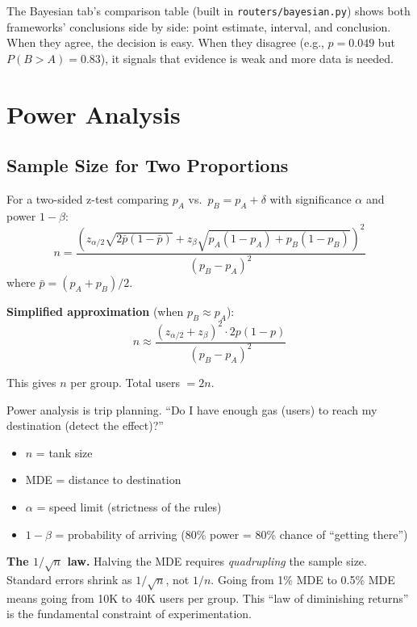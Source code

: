 \documentclass[11pt,a4paper]{article}
\newcommand{\code}[1]{\texttt{#1}}
\begin{document}
\vspace{8pt}

\begin{application}
The Bayesian tab's comparison table (built in \code{routers/bayesian.py}) shows both frameworks' conclusions side by side: point estimate, interval, and conclusion. When they agree, the decision is easy. When they disagree (e.g., $p = 0.049$ but $P(B>A) = 0.83$), it signals that evidence is weak and more data is needed.
\end{application}


\section{Power Analysis}
\label{sec:power}

\subsection{Sample Size for Two Proportions}

\begin{formaldef}
For a two-sided z-test comparing $p_A$ vs.\ $p_B = p_A + \delta$ with significance $\alpha$ and power $1-\beta$:
\[
n = \frac{\left(z_{\alpha/2}\sqrt{2\bar{p}(1-\bar{p})} + z_{\beta}\sqrt{p_A(1-p_A) + p_B(1-p_B)}\right)^2}{(p_B - p_A)^2}
\]
where $\bar{p} = (p_A + p_B)/2$.

\medskip
\textbf{Simplified approximation} (when $p_B \approx p_A$):
\[
n \approx \frac{(z_{\alpha/2} + z_\beta)^2 \cdot 2p(1-p)}{(p_B - p_A)^2}
\]

This gives $n$ per group. Total users $= 2n$.
\end{formaldef}

\vspace{8pt}

\begin{intuition}
Power analysis is trip planning. ``Do I have enough gas (users) to reach my destination (detect the effect)?''

\begin{itemize}[nosep]
  \item $n$ = tank size
  \item MDE = distance to destination
  \item $\alpha$ = speed limit (strictness of the rules)
  \item $1-\beta$ = probability of arriving (80\% power = 80\% chance of ``getting there'')
\end{itemize}

\textbf{The $1/\sqrt{n}$ law.} Halving the MDE requires \emph{quadrupling} the sample size. Standard errors shrink as $1/\sqrt{n}$, not $1/n$. Going from 1\% MDE to 0.5\% MDE means going from 10K to 40K users per group. This ``law of diminishing returns'' is the fundamental constraint of experimentation.
\end{intuition}
\end{document}
